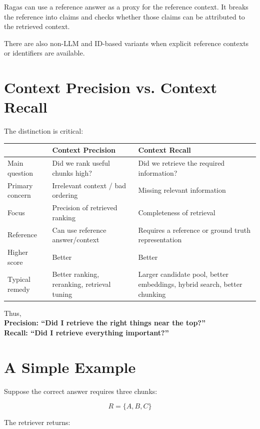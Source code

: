 \documentclass[12pt, a4paper]{article}
\begin{document}
Ragas can use a reference answer as a proxy for the reference context. It breaks the reference into claims and checks whether those claims can be attributed to the retrieved context.

There are also non-LLM and ID-based variants when explicit reference contexts or identifiers are available.

\section{Context Precision vs. Context Recall}

The distinction is critical:

\begin{center}
\begin{tabular}{p{}p{}p{}}
\toprule
 & \textbf{Context Precision} & \textbf{Context Recall}\\
\midrule
Main question & Did we rank useful chunks high? & Did we retrieve the required information?\\
Primary concern & Irrelevant context / bad ordering & Missing relevant information\\
Focus & Precision of retrieved ranking & Completeness of retrieval\\
Reference & Can use reference answer/context & Requires a reference or ground truth representation\\
Higher score & Better & Better\\
Typical remedy & Better ranking, reranking, retrieval tuning & Larger candidate pool, better embeddings, hybrid search, better chunking\\
\bottomrule
\end{tabular}
\end{center}

Thus, 
\\
\textbf{Precision: ``Did I retrieve the right things near the top?''}\\[4pt]
\textbf{Recall: ``Did I retrieve everything important?''}

\section{A Simple Example}

Suppose the correct answer requires three chunks:

\[
R = \{A,B,C\}
\]

The retriever returns:
\end{document}
